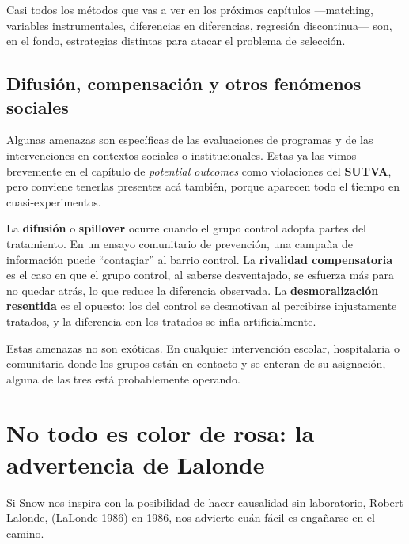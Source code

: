 \documentclass[
  letterpaper,
  DIV=11,
  numbers=noendperiod,
  oneside]{scrreprt}
\begin{document}
\begin{tcolorbox}[enhanced jigsaw, breakable, colback=white, rightrule=.15mm, opacityback=0, colframe=quarto-callout-color-frame, bottomrule=.15mm, left=2mm, toprule=.15mm, leftrule=.75mm, arc=.35mm]
Casi todos los métodos que vas a ver en los próximos capítulos
---matching, variables instrumentales, diferencias en diferencias,
regresión discontinua--- son, en el fondo, estrategias distintas para
atacar el problema de selección.
\end{tcolorbox}

\hypertarget{difusiuxf3n-compensaciuxf3n-y-otros-fenuxf3menos-sociales}{%
\subsection{Difusión, compensación y otros fenómenos
sociales}\label{difusiuxf3n-compensaciuxf3n-y-otros-fenuxf3menos-sociales}}

Algunas amenazas son específicas de las evaluaciones de programas y de
las intervenciones en contextos sociales o institucionales. Estas ya las
vimos brevemente en el capítulo de \emph{potential outcomes} como
violaciones del \textbf{SUTVA}, pero conviene tenerlas presentes acá
también, porque aparecen todo el tiempo en cuasi-experimentos.

La \textbf{difusión} o \textbf{spillover} ocurre cuando el grupo control
adopta partes del tratamiento. En un ensayo comunitario de prevención,
una campaña de información puede ``contagiar'' al barrio control. La
\textbf{rivalidad compensatoria} es el caso en que el grupo control, al
saberse desventajado, se esfuerza más para no quedar atrás, lo que
reduce la diferencia observada. La \textbf{desmoralización resentida} es
el opuesto: los del control se desmotivan al percibirse injustamente
tratados, y la diferencia con los tratados se infla artificialmente.

Estas amenazas no son exóticas. En cualquier intervención escolar,
hospitalaria o comunitaria donde los grupos están en contacto y se
enteran de su asignación, alguna de las tres está probablemente
operando.

\hypertarget{no-todo-es-color-de-rosa-la-advertencia-de-lalonde}{%
\section{No todo es color de rosa: la advertencia de
Lalonde}\label{no-todo-es-color-de-rosa-la-advertencia-de-lalonde}}

Si Snow nos inspira con la posibilidad de hacer causalidad sin
laboratorio, Robert Lalonde, (LaLonde
1986)
en 1986, nos advierte cuán fácil es engañarse en el camino.
\end{document}
